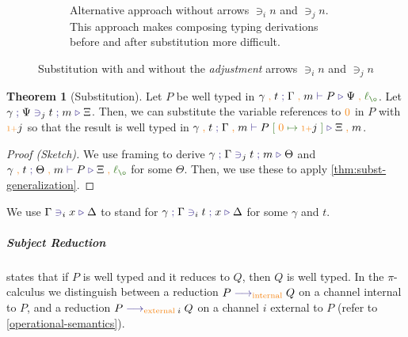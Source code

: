 \documentclass[a4paper,UKenglish,cleveref,autoref,thm-restate,authorcolumns]{lipics-v2019}
\theoremstyle{definition}
\newtheorem{nitheorem}{Theorem}
\newcommand{\picalc}{$\pi$-calculus}
\newcommand{\type}[1]{\textcolor{BlueViolet}{\operatorname{#1}}}
\newcommand{\constr}[1]{\textcolor{BurntOrange}{\operatorname{#1}}}
\newcommand{\func}[1]{\textcolor{OliveGreen}{\operatorname{#1}}}
\newcommand{\suc}{\constr{\scriptstyle 1+}}
\newcommand{\comma}{\; \constr{,} \;}
\newcommand{\subst}[3]{#1 \; \func{[} \; #3 \; \func{\mapsto} \;#2 \; \func{]}}
\newcommand{\lz}{\func{\ell_{\o}}}
\newcommand{\reduce}[1]{\; \type{\longrightarrow}_{#1} \;}
\newcommand{\types}[4]{#1 \; \type{;} \; #2 \; \type{\vdash} \; #3 \; \type{\triangleright} \; #4}
\newcommand{\contains}[6]{#1 \; \type{;} \; #2 \; \type{\ni}_{#3} \; #4 \; \type{;} \; #5 \; \type{\triangleright} \; #6}
\newcommand{\containsusage}[4]{#1 \; \type{\ni}_{#2} \; #3 \; \type{\triangleright} \; #4}
\begin{document}
\begin{figure}[h]
\begin{subfigure}{.4\textwidth}
    \caption{
      Alternative approach without arrows $\ni_i n$ and $\ni_j n$.
      This approach makes composing typing derivations before and after substitution more difficult.
    }
    \label{fig:subst-alternative}
  \end{subfigure}
  \caption{Substitution with and without the \emph{adjustment} arrows $\ni_i n$ and $\ni_j n$}
\end{figure}

\begin{nitheorem}[Substitution]
  \label{thm:substitution}
  Let $P$ be well typed in $\types{\gamma \comma t}{\Gamma \comma m}{P}{\Psi \comma \lz}$.
  Let $\contains{\gamma}{\Psi}{j}{t}{m}{\Xi}$.
  Then, we can substitute the variable references to $\constr{0}$ in $P$ with $\suc j$ so that the result is well typed in $\types{\gamma \comma t}{\Gamma \comma m}{\subst{P}{\suc j}{\constr{0}}}{\Xi \comma m}$.
\end{nitheorem}
\begin{proof}[Proof (Sketch)]
  We use framing to derive $\contains{\gamma}{\Gamma}{j}{t}{m}{\Theta}$ and $\types{\gamma \comma t}{\Theta \comma m}{P}{\Xi \comma \lz}$ for some $\Theta$.
  Then, we use these to apply \autoref{thm:subst-generalization}.
\end{proof}


\begin{note}
  We use $\containsusage{\Gamma}{i}{x}{\Delta}$ to stand for $\contains{\gamma}{\Gamma}{i}{t}{x}{\Delta}$ for some $\gamma$ and $t$.
\end{note}

\subparagraph*{Subject Reduction}
states that if $P$ is well typed and it reduces to $Q$, then $Q$ is well typed.
In the \picalc{} we distinguish between a reduction $P \reduce{\constr{internal}} Q$ on a channel internal to $P$, and a reduction $P \reduce{\constr{external} \; i} Q$ on a channel $i$ external to $P$ (refer to \autoref{operational-semantics}).
\end{document}
